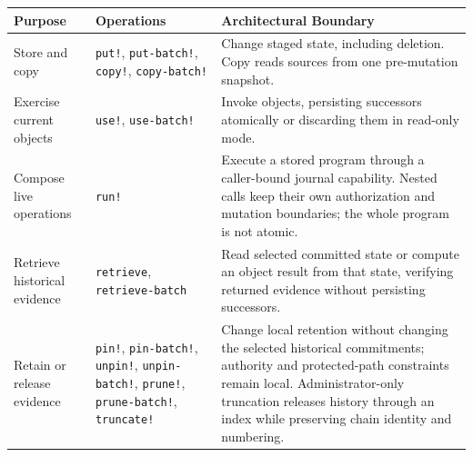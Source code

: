 \begin{tabularx}{\textwidth}{@{}P{0.25\textwidth}P{0.285\textwidth}X@{}}
\toprule
\textbf{Purpose} & \textbf{Operations} & \textbf{Architectural Boundary} \\
\midrule
Store and copy & \texttt{put!}, \texttt{put-batch!}, \texttt{copy!}, \texttt{copy-batch!} & Change staged state, including deletion. Copy reads sources from one pre-mutation snapshot. \\
Exercise current objects & \texttt{use!}, \texttt{use-batch!} & Invoke objects, persisting successors atomically or discarding them in read-only mode. \\
Compose live operations & \texttt{run!} & Execute a stored program through a caller-bound journal capability. Nested calls keep their own authorization and mutation boundaries; the whole program is not atomic. \\
Retrieve historical evidence & \texttt{retrieve}, \texttt{retrieve-batch} & Read selected committed state or compute an object result from that state, verifying returned evidence without persisting successors. \\
Retain or release evidence & \texttt{pin!}, \texttt{pin-batch!}, \texttt{unpin!}, \texttt{unpin-batch!}, \texttt{prune!}, \texttt{prune-batch!}, \texttt{truncate!} & Change local retention without changing the selected historical commitments; authority and protected-path constraints remain local. Administrator-only truncation releases history through an index while preserving chain identity and numbering. \\
\bottomrule
\end{tabularx}
